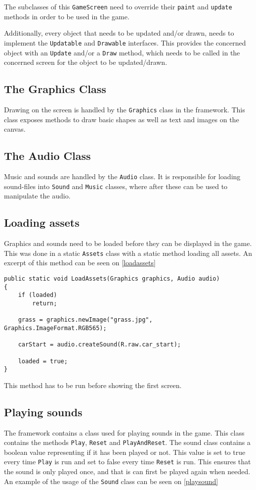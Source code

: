 The subclasses of this \lstinline|GameScreen| need to override their \lstinline|paint| and \lstinline|update| methods in order to be used in the game.

Additionally, every object that needs to be updated and/or drawn, needs to implement the \lstinline|Updatable| and \lstinline|Drawable| interfaces.
This provides the concerned object with an \lstinline|Update| and/or a \lstinline|Draw| method, which needs to be called in the concerned screen for the object to be updated/drawn.

\subsection{The Graphics Class}
Drawing on the screen is handled by the \lstinline|Graphics| class in the framework.
This class exposes methods to draw basic shapes as well as text and images on the canvas. 

\subsection{The Audio Class}
Music and sounds are handled by the \lstinline|Audio| class.
It is responsible for loading sound-files into \lstinline|Sound| and \lstinline|Music| classes, where after these can be used to manipulate the audio.

\subsection{Loading assets}
Graphics and sounds need to be loaded before they can be displayed in the game. 
This was done in a static \lstinline|Assets| class with a static method loading all assets.
An excerpt of this method can be seen on \cref{loadassets}

\begin{lstlisting}[caption=The LoadAssets method, label=loadassets]
public static void LoadAssets(Graphics graphics, Audio audio) 
{
	if (loaded)
		return;

	grass = graphics.newImage("grass.jpg", Graphics.ImageFormat.RGB565);
	
	carStart = audio.createSound(R.raw.car_start);
	
	loaded = true;
}
\end{lstlisting}

This method has to be run before showing the first screen.

\subsection{Playing sounds}
The framework contains a class used for playing sounds in the game. 
This class contains the methods \lstinline|Play|, \lstinline|Reset| and \lstinline|PlayAndReset|.
The sound class contains a boolean value representing if it has been played or not. 
This value is set to true every time \lstinline|Play| is run and set to false every time \lstinline|Reset| is run.
This ensures that the sound is only played once, and that is can first be played again when needed.
An example of the usage of the \lstinline|Sound| class can be seen on \cref{playsound}

